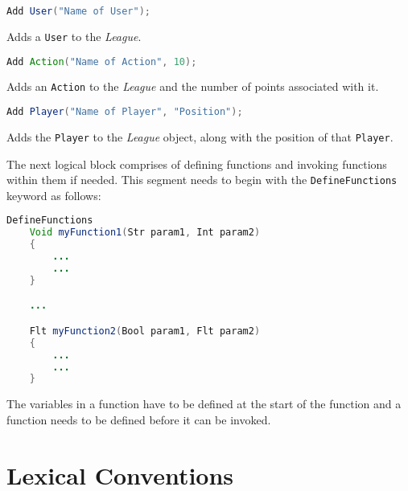 \documentclass[12pt]{report}
\begin{document}
\begin{singlespace}
\begin{lstlisting}[language=Java,label=some-code,caption=Adding a User]
Add User("Name of User");
\end{lstlisting}
\end{singlespace}

Adds a \texttt{User} to the \textit{League}.

\begin{singlespace}
\begin{lstlisting}[language=Java,label=some-code,caption=Adding an Action]
Add Action("Name of Action", 10);
\end{lstlisting}
\end{singlespace}

Adds an \texttt{Action} to the \textit{League} and the number of points associated with it.

\begin{singlespace}
\begin{lstlisting}[language=Java,label=some-code,caption=Adding a Player]
Add Player("Name of Player", "Position");	
\end{lstlisting}
\end{singlespace}

Adds the \texttt{Player} to the \textit{League} object, along with the position of that \texttt{Player}.

The next logical block comprises of defining functions and invoking functions within them if needed. This segment needs to begin with the \texttt{DefineFunctions} keyword as follows:

\begin{singlespace}
\begin{lstlisting}[language=Java,label=some-code,caption=Defining functions]
DefineFunctions
	Void myFunction1(Str param1, Int param2)
	{
		...
		...
	}

	...

	Flt myFunction2(Bool param1, Flt param2)
	{
		...
		...
	}
\end{lstlisting}
\end{singlespace}

The variables in a function have to be defined at the start of the function and a function needs to be defined before it can be invoked. 

\section{Lexical Conventions}
\end{document}
